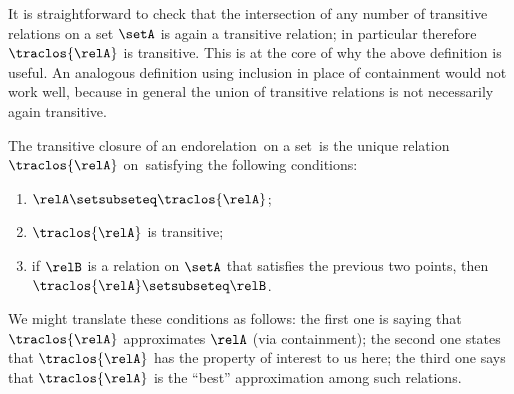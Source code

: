 \begin{remark}
    It is straightforward to check that the intersection of any number of transitive relations on a set $\setA$ is again a transitive relation; in particular therefore $\traclos{\relA}$ is transitive.
    This is at the core of why the above definition is useful.
    An analogous definition using inclusion in place of containment would not work well, because in general the union of transitive relations is not necessarily again transitive.
\end{remark}

\begin{remark}
    The transitive closure of an endorelation~\relA on a set~\setA is the unique relation $\traclos{\relA}$ on~\setA satisfying the following conditions:
    \begin{enumerate}
        \item $\relA \setsubseteq \traclos{\relA}$;
        \item $\traclos{\relA}$ is transitive;
        \item if $\relB$ is a relation on $\setA$ that satisfies the previous two points, then $\traclos{\relA} \setsubseteq \relB$.
    \end{enumerate}
    We might translate these conditions as follows: the first one is saying that $\traclos{\relA}$ approximates $\relA$ (via containment); the second one states that $\traclos{\relA}$ has the property of interest to us here; the third one says that $\traclos{\relA}$ is the ``best'' approximation among such relations.
\end{remark}


